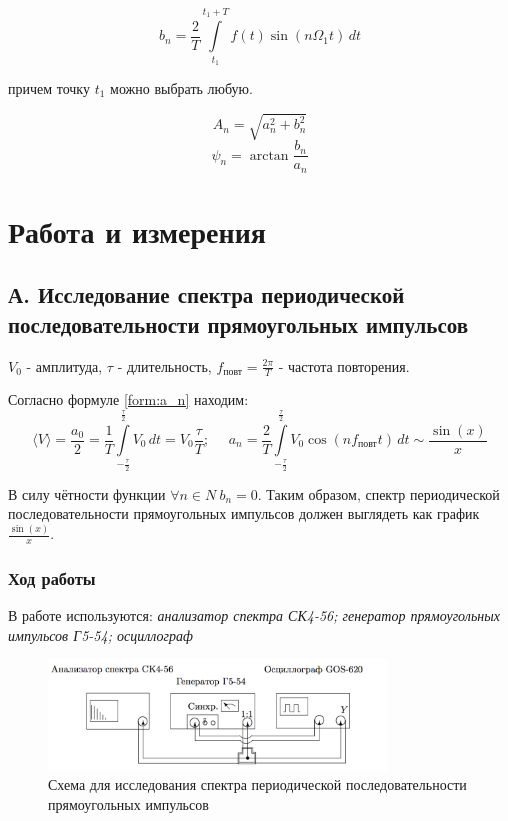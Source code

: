 \documentclass[a4paper, 12pt]{article}
\begin{document}
\begin{equation}
	b_{n} = \frac{2}{T}\int\limits_{t_{1}}^{t_{1}+T}f(t)\sin(n\Omega_{1}t)\, dt 
\label{form:b_n}
\end{equation}

причем точку $t_{1}$ можно выбрать любую.

\begin{equation}
\label{form:A_n}
	A_{n} = \sqrt{a_{n}^2+b_{n}^2}
\end{equation}
\begin{equation}
	\psi_{n} = \arctan\frac{b_{n}}{a_{n}}
\label{form:psi_n}
\end{equation}
\section{Работа и измерения}
\subsection*{А. Исследование спектра периодической последовательности прямоугольных импульсов}

$V_0$  - амплитуда, $\tau$ - длительность, $f_\text{повт} = \frac{2\pi}{T} $ - частота повторения.

Согласно формуле \ref{form:a_n} находим:
$$ \langle V \rangle = \frac{a_0}{2} =  \frac{1}{T}\int\limits_{ -\frac{\tau}{2} } ^ {\frac{\tau}{2} } V_0\,dt = V_0 \frac{\tau}{T}
;~~~~~~
\label{form:app_a_n}
	a_n = \frac{2}{T}\int\limits_{ -\frac{\tau}{2} } ^ {\frac{\tau}{2} } V_0\cos(nf_\text{повт}t)\, dt \sim \frac{\sin(x)}{x}$$

 
В силу чётности функции $\forall n \in {N} \ b_n=0$. Таким образом, спектр периодической последовательности прямоугольных импульсов должен выглядеть как график $\frac{\sin(x)}{x}$.
\subsubsection*{Ход работы}
В работе используются: \textit{анализатор спектра СК4-56; генератор прямоугольных импульсов Г5-54; осциллограф}



\begin{figure}[H]
\centering
\includegraphics[width = 0.8\textwidth]{schemeA}
\caption{Схема для исследования спектра периодической последовательности прямоугольных импульсов}
\label{img:scheme A}
\end{figure}
\end{document}
